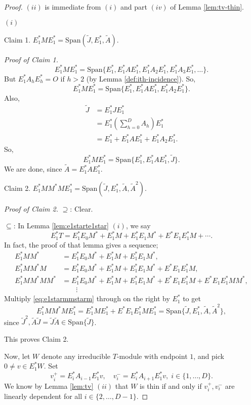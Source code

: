 \documentclass[
]{book}
\theoremstyle{definition}
\theoremstyle{definition}
\theoremstyle{definition}
\theoremstyle{definition}
\theoremstyle{remark}
\begin{document}
\begin{proof}
\leavevmode

\((ii)\) is immediate from \((i)\) and part \((iv)\) of Lemma \ref{lem:tv-thin}.

\((i)\)

Claim 1. \(E^*_1ME^*_1 = \mathrm{Span}(\tilde{J}, E^*_1, \tilde{A})\).

\emph{Proof of Claim 1.}
\[E^*_1ME^*_1 = \mathrm{Span}\{E^*_1, E^*_1AE^*_1, E^*_1A_2E^*_1, E^*_1A_3E^*_1, \ldots\}.\]
But \(E^*_1A_hE^*_h = O\) if \(h >2\) (by Lemma \ref{def:ith-incidence}).
So,
\[E^*_1ME^*_1 = \mathrm{Span}\{E^*_1, E^*_1AE^*_1, E^*_1A_2E^*_1\}.\]
Also,
\begin{align}
\tilde{J} & = E^*_1JE^*_1 \\
& = E^*_1\left(\sum_{h=0}^DA_h\right)E^*_1\\
& = E^*_1 + E^*_1AE^*_1 + E^*_1A_2E^*_1.
\end{align}
So,
\[E^*_1ME^*_1 = \mathrm{Span}\{E^*_1, E^*_1AE^*_1, \tilde{J}\}.\]
We are done, since \(\tilde{A} = E^*_1AE^*_1\).

Claim 2. \(E^*_1MM^*ME^*_1 = \mathrm{Span}(\tilde{J}, E^*_1, \tilde{A}, \tilde{A}^2)\).

\emph{Proof of Claim 2.}
\(\supseteq\): Clear.

\(\subseteq\): In Lemma \ref{lem:e1starte1star} \((i)\), we say
\[E^*_1T = E^*_1E_0M^* + E^*_1M + E^*_1E_1M^* + E^*E_1E^*_1M + \cdots.\]
In fact, the proof of that lemma gives a sequence;
\begin{align}
E^*_1MM^* & = E^*_1E_0M^* + E^*_1M + E^*_1E_1M^*,\\
E^*_1MM^*M & = E^*_1E_0M^* + E^*_1M + E^*_1E_1M^* + E^*E_1E^*_1M, \label{eq:e1starmmstarm}\\
E^*_1MM^*MM^* & = E^*_1E_0M^* + E^*_1M + E^*_1E_1M^* + E^*E_1E^*_1M + E^*E_1E^*_1MM^*,\\
& \qquad \vdots
\end{align}
Multiply \eqref{eq:e1starmmstarm} through on the right by \(E^*_1\) to get
\[E^*_1MM^*ME^*_1 = E^*_1ME^*_1 + E^*E_1E^*_1ME^*_1 = \mathrm{Span}\{\tilde{J}, E^*_1, \tilde{A}, \tilde{A}^2\},\]
since \(\tilde{J}^2, \tilde{A}\tilde{J} = \tilde{J}\tilde{A}\in \mathrm{Span}\{\tilde{J}\}\).

This proves Claim 2.

Now, let \(W\) denote any irreducible \(T\)-module with endpoint \(1\), and pick \(0\neq v\in E^*_1W\). Set
\[v^+_i = E^*_iA_{i-1}E^*_1v, \quad v^-_i = E^*_iA_{i+1}E^*_1v, \; i\in \{1, \ldots, D\}.\]
We know by Lemma \ref{lem:tv} \((ii)\) that \(W\) is thin if and only if \(v^+_i, v^-_i\) are linearly dependent for all \(i\in \{2, \ldots, D-1\}\).


\end{proof}
\end{document}
